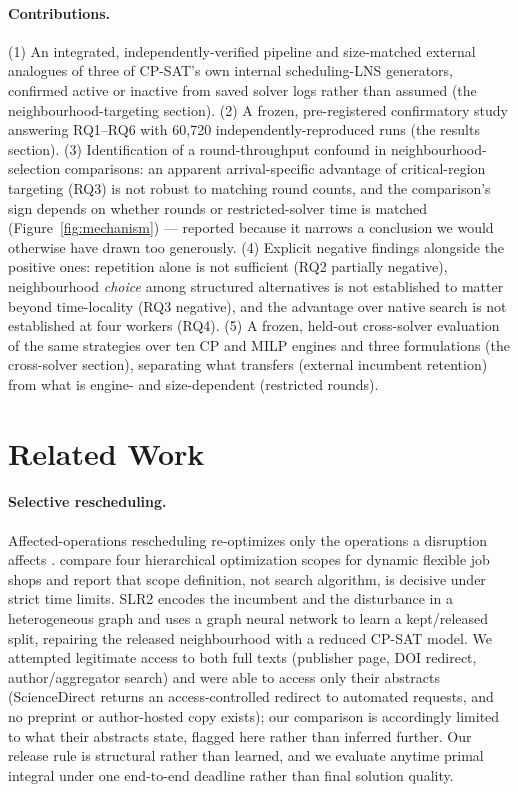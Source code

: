 \documentclass[letterpaper]{article} %
\begin{document}
\paragraph{Contributions.} (1) An integrated, independently-verified pipeline and size-matched external analogues of three of CP-SAT's own internal scheduling-LNS generators, confirmed active or inactive from saved solver logs rather than assumed (the neighbourhood-targeting section). (2) A frozen, pre-registered confirmatory study answering RQ1--RQ6 with 60{,}720 independently-reproduced runs (the results section). (3) Identification of a round-throughput confound in neighbourhood-selection comparisons: an apparent arrival-specific advantage of critical-region targeting (RQ3) is not robust to matching round counts, and the comparison's sign depends on whether rounds or restricted-solver time is matched (Figure~\ref{fig:mechanism}) --- reported because it narrows a conclusion we would otherwise have drawn too generously. (4) Explicit negative findings alongside the positive ones: repetition alone is not sufficient (RQ2 partially negative), neighbourhood \emph{choice} among structured alternatives is not established to matter beyond time-locality (RQ3 negative), and the advantage over native search is not established at four workers (RQ4). (5) A frozen, held-out cross-solver evaluation of the same strategies over ten CP and MILP engines and three formulations (the cross-solver section), separating what transfers (external incumbent retention) from what is engine- and size-dependent (restricted rounds).

\section{Related Work}

\paragraph{Selective rescheduling.} Affected-operations rescheduling re-optimizes only the operations a disruption affects \citep{abumaizar1997,subramaniam2003}. \citet{sun2026} compare four hierarchical optimization scopes for dynamic flexible job shops and report that scope definition, not search algorithm, is decisive under strict time limits. SLR2 \citep{linyang2026} encodes the incumbent and the disturbance in a heterogeneous graph and uses a graph neural network to learn a kept/released split, repairing the released neighbourhood with a reduced CP-SAT model. We attempted legitimate access to both full texts (publisher page, DOI redirect, author/aggregator search) and were able to access only their abstracts (ScienceDirect returns an access-controlled redirect to automated requests, and no preprint or author-hosted copy exists); our comparison is accordingly limited to what their abstracts state, flagged here rather than inferred further. Our release rule is structural rather than learned, and we evaluate anytime primal integral under one end-to-end deadline rather than final solution quality.
\end{document}

